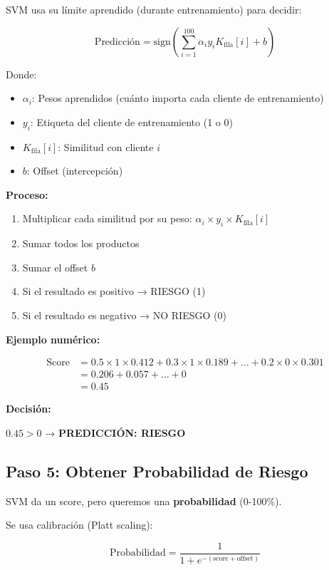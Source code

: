 \documentclass[11pt,a4paper,spanish]{article}
\begin{document}
SVM usa su límite aprendido (durante entrenamiento) para decidir:

\[
\text{Predicción} = \text{sign}\left(\sum_{i=1}^{100} \alpha_i y_i K_{\text{fila}}[i] + b\right)
\]

Donde:
\begin{itemize}
    \item $\alpha_i$: Pesos aprendidos (cuánto importa cada cliente de entrenamiento)
    \item $y_i$: Etiqueta del cliente de entrenamiento (1 o 0)
    \item $K_{\text{fila}}[i]$: Similitud con cliente $i$
    \item $b$: Offset (intercepción)
\end{itemize}

\textbf{Proceso:}

\begin{enumerate}
    \item Multiplicar cada similitud por su peso: $\alpha_i \times y_i \times K_{\text{fila}}[i]$
    \item Sumar todos los productos
    \item Sumar el offset $b$
    \item Si el resultado es positivo → RIESGO (1)
    \item Si el resultado es negativo → NO RIESGO (0)
\end{enumerate}

\textbf{Ejemplo numérico:}

\begin{align*}
\text{Score} &= 0.5 \times 1 \times 0.412 + 0.3 \times 1 \times 0.189 + \ldots + 0.2 \times 0 \times 0.301\\
&= 0.206 + 0.057 + \ldots + 0\\
&= 0.45
\end{align*}

\textbf{Decisión:}

$0.45 > 0$ → \textbf{PREDICCIÓN: RIESGO}

\subsection{Paso 5: Obtener Probabilidad de Riesgo}

SVM da un score, pero queremos una \textbf{probabilidad} (0-100\%).

Se usa calibración (Platt scaling):

\[
\text{Probabilidad} = \frac{1}{1 + e^{-(\text{score} + \text{offset})}}
\]
\end{document}
